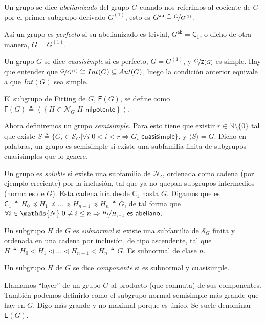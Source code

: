 \documentclass[12pt,a4paper,fleqn,spanish,final,openright]{extbook}
\theoremstyle{definition}
\theoremstyle{remark}
\theoremstyle{proof}
\begin{document}
Un grupo se dice \emph{abelianizado} del grupo $G$ cuando nos referimos al cociente de $G$ por el primer subgrupo derivado $G^{(1)}$, esto es $G^{\textsf{ab}}\triangleq \nicefrac{G}{G^{(1)}}$.

Así un grupo es \emph{perfecto} si su abelianizado es trivial, $G^{\textsf{ab}} = \mathsf{C}_1$, o dicho de otra manera, $G = G^{(1)}$.

Un grupo $G$ se dice \emph{cuasisimple} si es perfecto, $G = G^{(1)}$, y $\nicefrac{G}{\mathsf{Z}(G)}$ es simple. Hay que entender que $\nicefrac{G}{G^{(1)}}\cong Int(G) \subseteq Aut(G)$, luego la condición anterior equivale a que $Int(G)$ sea simple.

El subgrupo de Fitting de $G$, $\mathsf{F}(G)$, se define como $\mathsf{F}(G) \triangleq \left\langle{\left\lbrace{H  \in \mathcal{N}_G \vert H \textsf{ nilpotente}}\right\rbrace}\right\rangle$.

Ahora definiremos un grupo \emph{semisimple}. Para esto tiene que existir $r \in \mathds{N}\setminus\lbrace 0 \rbrace$ tal que existe $S\triangleq \lbrace{G_i  \in \mathcal{S}_G \vert \forall i\; 0<i<r  \Rightarrow  G_i \textsf{ cuasisimple}}\rbrace$, y $\langle S \rangle = G$. Dicho en palabras, un grupo es semisimple si existe una subfamilia finita de subgrupos cuasisimples que lo genere.

Un grupo es \emph{soluble} si existe una subfamilia de $\mathcal{N}_G$ ordenada como cadena (por ejemplo creciente) por la inclusión, tal que ya no quepan subgrupos intermedios (normales de $G$). Esta cadena iría desde $\mathsf{C}_1$ hasta $G$. Digamos que es $\mathsf{C}_1\triangleq H_0   \preccurlyeq   H_1   \preccurlyeq   \ldots   \preccurlyeq   H_{n-1}   \preccurlyeq   H_n \triangleq G$, de tal forma que $\forall i   \in \mathds{N}\;0  \neq   i\leq n  \Rightarrow   \nicefrac{H_i}{H_{i-1}} \textsf{ es abeliano}$.

Un subgrupo $H$ de $G$ es \emph{subnormal} si existe una subfamilia de $\mathcal{S}_{G}$ finita y ordenada en una cadena por inclusión, de tipo ascendente, tal que $H\triangleq H_0 \lhd H_1 \lhd \ldots \lhd H_{n-1} \lhd H_n \triangleq G$. Es subnormal de clase $n$.

Un subgrupo $H$ de $G$ se dice \emph{componente} si es subnormal y cuasisimple.

Llamamos ``layer'' de un grupo $G$ al producto (que conmuta) de sus componentes. También podemos definirlo como el subgrupo normal semisimple más grande que hay en $G$. Digo más grande y no maximal porque es único. Se suele denominar $\mathsf{E}(G)$.
\end{document}
